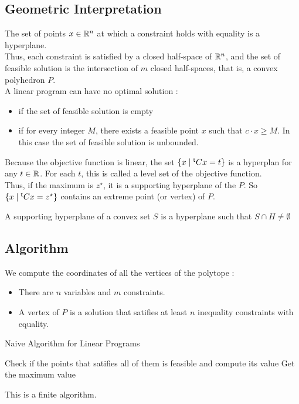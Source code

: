 \documentclass[12pt]{cours}
\begin{document}
\subsection{Geometric Interpretation}
The set of points $x \in \mathbb{R}^{n}$ at which a constraint holds with equality is a hyperplane. \\
Thus, each constraint is satisfied by a closed half-space of $\mathbb{R}^{n}$, and the set of feasible solution is the intersection of $m$ closed half-spaces, that is, a convex polyhedron $P$. \\
A linear program can have no optimal solution : 
\begin{itemize}
    \item if the set of feasible solution is empty
    \item if for every integer $M$, there exists a feasible point $x$ such that $c \cdot x \geq M$. In this case the set of feasible solution is unbounded. 
\end{itemize}
\begin{proposition}
    Because the objective function is linear, the set $\{x \mid {^{\mathsf{t}}}Cx = t\}$ is a hyperplan for any $t \in \mathbb{R}$. For each $t$, this is called a level set of the objective function. \\
    Thus, if the maximum is $z^{\star}$, it is a supporting hyperplane of the $P$. So $\{x \mid {^{\mathsf{t}}}Cx = z^{\star}\}$ contains an extreme point (or vertex) of $P$. 
\end{proposition}

\begin{definition}
    A supporting hyperplane of a convex set $S$ is a hyperplane such that $S \cap H \neq \emptyset$
\end{definition}

\subsection{Algorithm}
We compute the coordinates of all the vertices of the polytope : 
\begin{itemize}
    \item There are $n$ variables and $m$ constraints. 
    \item A vertex of $P$ is a solution that satifies at least $n$ inequality constraints with equality.
\end{itemize}
\begin{algorithm}
    \caption{Naive Algorithm for Linear Programs}
    \begin{algorithmic}
            \State Check if the points that satifies all of them is feasible and compute its value
        \EndFor
        \State Get the maximum value
    \end{algorithmic}
\end{algorithm}
This is a finite algorithm. 
\end{document}
